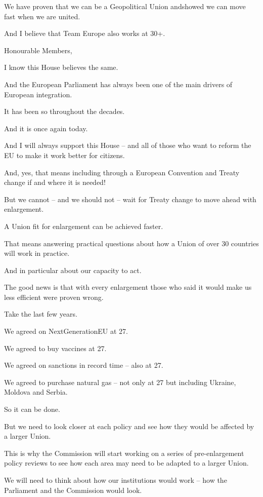 \documentclass[a4paper,11pt]{article}
\begin{document}
We have proven that we can be a Geopolitical Union andshowed we can move fast when we are united.

And I believe that Team Europe also works at 30+.

 

Honourable Members,

I know this House believes the same.

And the European Parliament has always been one of the main drivers of European integration.

It has been so throughout the decades.

And it is once again today. 

And I will always support this House – and all of those who want to reform the EU to make it work better for citizens.

And, yes, that means including through a European Convention and Treaty change if and where it is needed!

But we cannot – and we should not – wait for Treaty change to move ahead with enlargement.

A Union fit for enlargement can be achieved faster.

That means answering practical questions about how a Union of over 30 countries will work in practice.

And in particular about our capacity to act.

The good news is that with every enlargement those who said it would make us less efficient were proven wrong.

Take the last few years.

We agreed on NextGenerationEU at 27.

We agreed to buy vaccines at 27.

We agreed on sanctions in record time – also at 27.

We agreed to purchase natural gas – not only at 27 but including Ukraine, Moldova and Serbia.

So it can be done.

But we need to look closer at each policy and see how they would be affected by a larger Union.

This is why the Commission will start working on a series of pre-enlargement policy reviews to see how each area may need to be adapted to a larger Union.

We will need to think about how our institutions would work – how the Parliament and the Commission would look.
\end{document}
